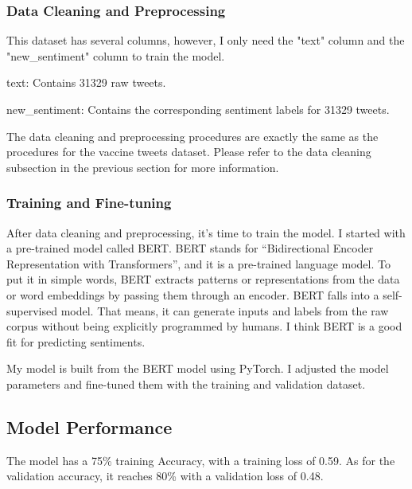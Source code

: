 \documentclass{article}
\begin{document}
\subsubsection{Data Cleaning and Preprocessing}
This dataset has several columns, however, I only need the "text" column and the "new\_sentiment" column to train the model.

text: Contains 31329 raw tweets.

new\_sentiment: Contains the corresponding sentiment labels for 31329 tweets.

The data cleaning and preprocessing procedures are exactly the same as the procedures for the vaccine tweets dataset.  Please refer to the data cleaning subsection in the previous section for more information.

\subsubsection{Training and Fine-tuning}
After data cleaning and preprocessing, it's time to train the model. I started with a pre-trained model called BERT. BERT stands for “Bidirectional Encoder Representation with Transformers”, and it is a pre-trained language model. To put it in simple words, BERT extracts patterns or representations from the data or word embeddings by passing them through an encoder. BERT falls into a self-supervised model. That means, it can generate inputs and labels from the raw corpus without being explicitly programmed by humans. I think BERT is a good fit for predicting sentiments.

My model is built from the BERT model using PyTorch. I adjusted the model parameters and fine-tuned them with the training and validation dataset. 

\subsection{Model Performance}
The model has a 75\% training Accuracy, with a training loss of 0.59. As for the validation accuracy, it reaches 80\% with a validation loss of 0.48.
\end{document}
